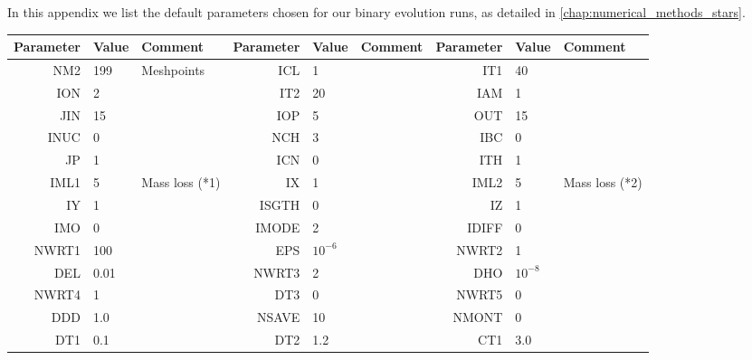 In this appendix we list the default parameters chosen for our binary evolution runs, as detailed in \autoref{chap:numerical_methods_stars}.

\begin{table}[!htbp]
    \centering
    \begin{tabular}{rll|rll|rll}
    \toprule
       Parameter & Value     & Comment   &   Parameter & Value     & Comment   &   Parameter & Value     & Comment   \\
    \midrule
             NM2 & 199       & Meshpoints &         ICL & 1         &           &         IT1 & 40        &           \\
             ION & 2         &           &         IT2 & 20        &           &         IAM & 1         &           \\
             JIN & 15        &           &         IOP & 5         &           &         OUT & 15        &           \\
            INUC & 0         &           &         NCH & 3         &           &         IBC & 0         &           \\
              JP & 1         &           &         ICN & 0         &           &         ITH & 1         &           \\
            IML1 & 5         & Mass loss (*1) &     IX & 1         &           &        IML2 & 5         & Mass loss (*2) \\
              IY & 1         &           &       ISGTH & 0         &           &          IZ & 1         &           \\
             IMO & 0         &           &       IMODE & 2         &           &       IDIFF & 0         &           \\
           NWRT1 & 100       &           &         EPS & $10^{-6}$ &           &       NWRT2 & 1         &           \\
             DEL & 0.01      &           &       NWRT3 & 2         &           &         DHO & $10^{-8}$ &           \\
           NWRT4 & 1         &           &         DT3 & 0         &           &       NWRT5 & 0         &           \\
             DDD & 1.0       &           &       NSAVE & 10        &           &       NMONT & 0         &           \\
             DT1 & 0.1       &           &         DT2 & 1.2       &           &         CT1 & 3.0       &           \\

\end{tabular}
\end{table}
